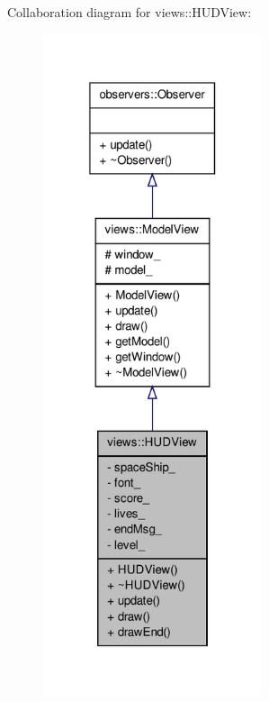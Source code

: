 \-Collaboration diagram for views\-:\-:\-H\-U\-D\-View\-:
\nopagebreak
\begin{figure}[H]
\begin{center}
\leavevmode
\includegraphics[height=550pt]{df/df3/classviews_1_1HUDView__coll__graph}
\end{center}
\end{figure}
